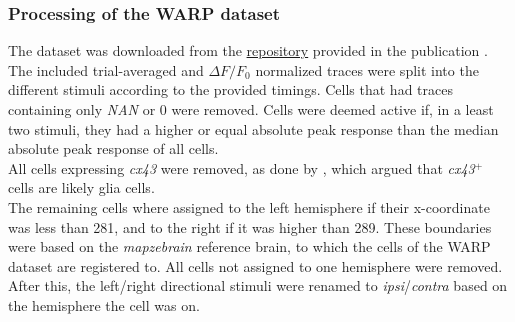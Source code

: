 \documentclass[12pt, a4paper, oneside]{article}
\begin{document}
\subsubsection{Processing of the WARP dataset}
\label{sec:warp proc}
The dataset was downloaded from the \href{https://figshare.com/s/d1d19b105c4f74865c32}{repository} \parencite{WARP_datasets} provided in the publication \parencite{marquez-legorretaWholeBrainCoMappingGene2026}. The included trial-averaged and $\Delta F/F_{0}$ normalized traces were split into the different stimuli according to the provided timings. Cells that had traces containing only \textit{NAN} or 0 were removed. Cells were deemed active if, in a least two stimuli, they had a higher or equal absolute peak response than the median absolute peak response of all cells.\\
All cells expressing \textit{cx43} were removed, as done by \cite{marquez-legorretaWholeBrainCoMappingGene2026}, which argued that \textit{cx43}$^+$ cells are likely glia cells.\\
The remaining cells where assigned to the left hemisphere if their x-coordinate was less than 281, and to the right if it was higher than 289. These boundaries were based on the \textit{mapzebrain} reference brain, to which the cells of the WARP dataset are registered to.
All cells not assigned to one hemisphere were removed. After this, the left/right directional stimuli were renamed to \textit{ipsi}/\textit{contra } based on the hemisphere the cell was on.\\
\end{document}
